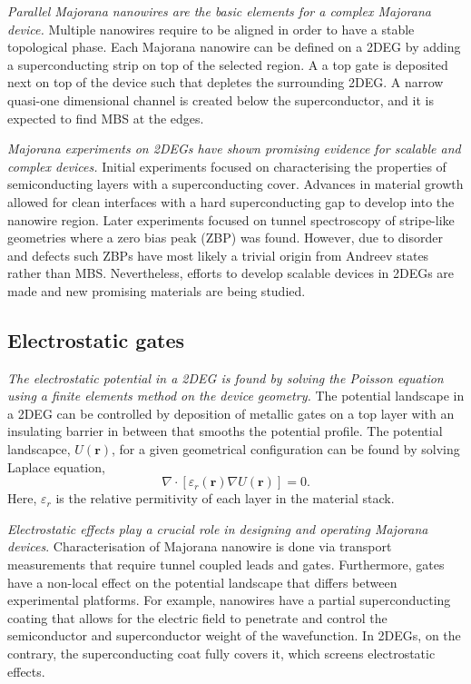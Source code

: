 \textit{Parallel Majorana nanowires are the basic elements for a complex Majorana device.}
Multiple nanowires require to be aligned in order to have a stable topological phase.
Each Majorana nanowire can be defined on a 2DEG by adding a superconducting strip on top of the selected region.
A a top gate is deposited next on top of the device such that depletes the surrounding 2DEG.
A narrow quasi-one dimensional channel is created below the superconductor, and it is expected to find MBS at the edges.

\textit{Majorana experiments on 2DEGs have shown promising evidence for scalable and complex devices.}
Initial experiments\cite{Shabani2015,Kjaergaard2016} focused on characterising the properties of semiconducting layers with a superconducting cover.
Advances in material growth allowed for clean interfaces with a hard superconducting gap to develop into the nanowire region.
Later experiments focused on tunnel spectroscopy of stripe-like geometries\cite{Suominen2017} where a zero bias peak (ZBP) was found.
However, due to disorder and defects such ZBPs have most likely a trivial origin from Andreev states rather than MBS.
Nevertheless, efforts to develop scalable devices in 2DEGs are made and new promising materials are being studied.

\subsection{Electrostatic gates}

\textit{The electrostatic potential in a 2DEG is found by solving the Poisson equation using a finite elements method on the device geometry.}
The potential landscape in a 2DEG can be controlled by deposition of metallic gates on a top layer with an insulating barrier in between that smooths the potential profile.
The potential landscapce, $U(\mathbf{r})$, for a given geometrical configuration can be found by solving Laplace equation, 
\begin{equation}
\nabla \cdot \left[ \varepsilon_r(\mathbf{r}) \nabla U(\mathbf{r}) \right] = 0.
\end{equation}
Here, $\varepsilon_r$ is the relative permitivity of each layer in the material stack.

\textit{Electrostatic effects play a crucial role in designing and operating Majorana devices}.
Characterisation of Majorana nanowire is done via transport measurements that require tunnel coupled leads and gates.
Furthermore, gates have a non-local effect on the potential landscape that differs between experimental platforms.
For example, nanowires have a partial superconducting coating that allows for the electric field to penetrate and control the semiconductor and superconductor weight of the wavefunction.
In 2DEGs, on the contrary, the superconducting coat fully covers it, which screens electrostatic effects.


